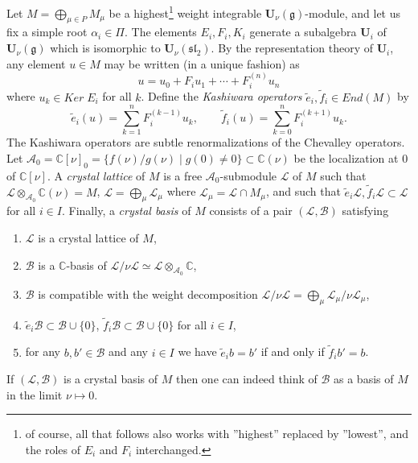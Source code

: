 \documentclass[a4paper,10pt]{amsart}
\def\U{\mathbf{U}}
\def\a{\alpha}
\def\C{\mathbb{C}}
\def\g{\mathfrak{g}}
\numberwithin{equation}{section}
\begin{document}
\vspace{.1in}

Let $M=\bigoplus_{\mu \in P} M_{\mu}$ be a highest\footnote{of course, all that follows also works with ''highest'' replaced by ''lowest'', and the roles of $E_i$ and $F_i$ interchanged.} weight integrable $\U_\nu(\g)$-module, and let us fix a simple root $\a_i \in \Pi$. The elements $E_i, F_i, K_i$ generate a subalgebra $\U_i$ of $\U_{\nu}(\g)$ which is isomorphic to $\U_{\nu}(\mathfrak{sl}_2)$. By the representation theory of $\U_i$, any element $u \in M$ may be written (in a unique fashion) as
\begin{equation}\label{E:Kashops}
u=u_0 + F_i u_1 + \cdots + F_i^{(n)} u_n
\end{equation}
where $u_k \in Ker\;E_i$ for all $k$. Define the \textit{Kashiwara operators} $\tilde{e}_i, \tilde{f}_i \in End(M)$ by
$$\tilde{e}_i(u)=\sum_{k=1}^n F_i^{(k-1)}u_k, \qquad \tilde{f}_i(u)=\sum_{k=0}^n F_i^{(k+1)}u_k.$$
 The Kashiwara operators are subtle renormalizations of the Chevalley operators. Let $\mathcal{A}_0=\C[\nu]_0 =\{f(\nu)/g(\nu)\;|\; g(0) \neq 0\}\subset \C(\nu)$ be the localization at $0$ of $\C[\nu]$. A \textit{crystal lattice} of $M$ is a free $\mathcal{A}_0$-submodule $\mathcal{L}$ of $M$ such that $\mathcal{L} \otimes_{\mathcal{A}_0} \C(\nu) = M$, $\mathcal{L}=\bigoplus_\mu \mathcal{L}_{\mu}$ where $\mathcal{L}_{\mu}=\mathcal{L} \cap M_{\mu}$, and such that $\tilde{e}_i \mathcal{L}, \tilde{f}_i \mathcal{L} \subset \mathcal{L}$ for all $i \in I$. Finally, a \textit{crystal basis} of $M$ consists of a pair $(\mathcal{L}, \mathcal{B})$ satisfying
\begin{enumerate}
\item[i)] $\mathcal{L}$ is a crystal lattice of $M$,
\item[ii)] $\mathcal{B}$ is a $\C$-basis of $\mathcal{L}/\nu \mathcal{L} \simeq \mathcal{L} \otimes_{\mathcal{A}_0} \C$,
\item[iii)] $\mathcal{B}$ is compatible with the weight decomposition $\mathcal{L}/\nu \mathcal{L}=\bigoplus_{\mu} \mathcal{L}_{\mu}/\nu \mathcal{L}_{\mu}$, 
\item[iv)] $\tilde{e}_i \mathcal{B} \subset \mathcal{B} \cup \{0\}$, $\tilde{f}_i \mathcal{B} \subset \mathcal{B} \cup \{0\}$ for all $i \in I$,
\item[v)] for any $b,b' \in \mathcal{B}$ and any $i \in I$ we have $\tilde{e}_ib=b'$ if and only if $\tilde{f}_ib'=b$.
\end{enumerate}
If $(\mathcal{L}, \mathcal{B})$ is a crystal basis of $M$ then one can indeed think of $\mathcal{B}$ as a basis of $M$ in the limit $\nu \mapsto 0$.
 
\end{document}
